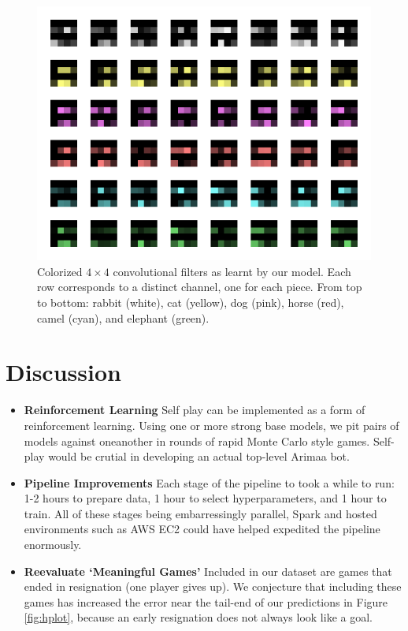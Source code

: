 \documentclass{article}
\begin{document}
\begin{figure}[h]
\centering
\includegraphics[scale=.5]{assets/figure-filters.png}
\caption{Colorized $4\times 4$ convolutional filters as learnt by our model.  Each row corresponds to a distinct channel, one for each piece.  From top to bottom: rabbit (white), cat (yellow), dog (pink), horse (red), camel (cyan), and elephant (green). }
\end{figure}

\section{Discussion}

\begin{itemize}
\item \textbf{Reinforcement Learning} Self play can be implemented as a form of reinforcement learning.  Using one or more strong base models, we pit pairs of models against oneanother in rounds of rapid Monte Carlo style games.  Self-play would be crutial in developing an actual top-level Arimaa bot.

\item \textbf{Pipeline Improvements} Each stage of the pipeline to took a while to run:  1-2 hours to prepare data, 1 hour to select hyperparameters, and 1 hour to train.  All of these stages being embarressingly parallel, Spark \cite{spark} and hosted environments such as AWS EC2 could have helped expedited the pipeline enormously.

\item \textbf{Reevaluate `Meaningful Games'} Included in our dataset are games that ended in resignation (one player gives up).  We conjecture that including these games has increased the error near the tail-end of our predictions in Figure \ref{fig:hplot}, because an early resignation does not always look like a goal.
\end{itemize}
\end{document}
